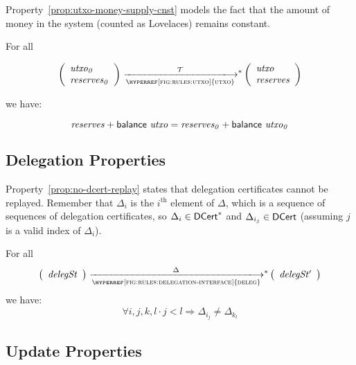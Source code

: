Property~\ref{prop:utxo-money-supply-cnst} models the fact that the amount of
money in the system (counted as Lovelaces) remains constant.

\begin{property}\label{prop:utxo-money-supply-cnst}
  For all

  $$
  \left(
    \begin{array}{l}
      \var{utxo_0}\\
      \var{reserves_0}
    \end{array}
  \right)
  \transtar{\hyperref[fig:rules:utxo]{utxo}}{\txs}
  \left(
    \begin{array}{l}
      \var{utxo}\\
      \var{reserves}
    \end{array}
  \right)
  $$

  we have:

  $$ \mathit{reserves} + \mathsf{balance}~ \mathit{utxo} =  \mathit{reserves_0} + \mathsf{balance}~ \mathit{utxo_0} $$
\end{property}

\subsection{Delegation Properties}
\label{sec:delegation-props}

Property~\ref{prop:no-dcert-replay} states that delegation certificates cannot be replayed. Remember
that $\Delta_i$ is the $i^{\text{th}}$ element of $\Delta$, which is a sequence of sequences of
delegation certificates, so $\Delta_i \in \mathsf{DCert}^{*}$ and $\Delta_{i_j} \in \mathsf{DCert}$ (assuming
$j$ is a valid index of $\Delta_i$).

\begin{property}\label{prop:no-dcert-replay}
  For all
  $$
  \left(
    \begin{array}{l}
      \var{delegSt}
    \end{array}
  \right)
  \transtar{\hyperref[fig:rules:delegation-interface]{deleg}}{\Delta}
  \left(
    \begin{array}{l}
      \var{delegSt'}
    \end{array}
  \right)
  $$
  we have:
  $$
  \forall i, j, k, l \cdot j < l \Rightarrow \Delta_{i_j} \neq \Delta_{k_l}
  $$
\end{property}

\subsection{Update Properties}
\label{sec:update-properties}

